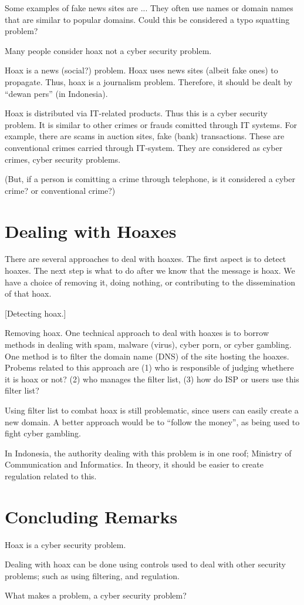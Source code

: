 \documentclass{article}
\begin{document}
Some examples of fake news sites are ... They often use names or domain names
that are similar to popular domains. Could this be considered a typo squatting
problem?

Many people consider hoax not a cyber security problem.

Hoax is a news (social?) problem. Hoax uses news sites (albeit fake ones) to
propagate. Thus, hoax is a journalism problem. Therefore, it should be dealt by
``dewan pers'' (in Indonesia).

Hoax is distributed via IT-related products. Thus this is a cyber security
problem. It is similar to other crimes or frauds comitted through IT systems.
For example, there are scams in auction sites, fake (bank) transactions. These
are conventional crimes carried through IT-system. They are considered as cyber
crimes, cyber security problems.

(But, if a person is comitting a crime through telephone, is it considered a
cyber crime? or conventional crime?)

\section{Dealing with Hoaxes}
There are several approaches to deal with hoaxes. The first aspect is to detect
hoaxes. The next step is what to do after we know that the message is hoax. We
have a choice of removing it, doing nothing, or contributing to the
dissemination of that hoax.

[Detecting hoax.]

Removing hoax. One technical approach to deal with hoaxes is to borrow methods
in dealing with spam, malware (virus), cyber porn, or cyber gambling. One
method is to filter the domain name (DNS) of the site hosting the hoaxes.
Probems related to this approach are (1) who is responsible of judging whethere
it is hoax or not? (2) who manages the filter list, (3) how do ISP or users use
this filter list?

Using filter list to combat hoax is still problematic, since users can easily
create a new domain. A better approach would be to ``follow the money'', as
being used to fight cyber gambling.

In Indonesia, the authority dealing with this problem is in one roof; Ministry
of Communication and Informatics. In theory, it should be easier to create
regulation related to this.

\section{Concluding Remarks}
Hoax is a cyber security problem.

Dealing with hoax can be done using controls used to deal with other security
problems; such as using filtering, and regulation.

What makes a problem, a cyber security problem?
\end{document}
